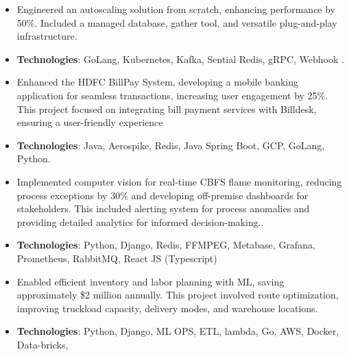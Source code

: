 
  

\begin{itemize}
\item Engineered an autoscaling solution from scratch, enhancing performance by 50\%. Included a managed database, gather tool, and versatile plug-and-play infrastructure.
\item \textbf{Technologies}: GoLang, Kubernetes, Kafka, Sential Redis, gRPC, Webhook .\\
\end{itemize}
\smallskip
\smallskip

\begin{itemize}
\item Enhanced the HDFC BillPay System, developing a mobile banking application for seamless transactions, increasing user engagement by 25\%. This project focused on integrating bill payment services with Billdesk, ensuring a user-friendly experience
\item \textbf{Technologies}: Java, Aerospike, Redis, Java Spring Boot, GCP, GoLang, Python.\\
\end{itemize}
\smallskip
\smallskip

\begin{itemize}
\item Implemented computer vision for real-time CBFS flame monitoring, reducing process exceptions by 30\% and developing off-premise dashboards for stakeholders. This included alerting system for process anomalies and providing detailed analytics for informed decision-making..
\item \textbf{Technologies}: Python, Django, Redis, FFMPEG, Metabase, Grafana, Prometheus, Rabbit\hspace{2mm}MQ, React JS (Typescript)\\
\end{itemize}
\smallskip
\smallskip

\begin{itemize}
\item Enabled efficient inventory and labor planning with ML, saving approximately \$2 million annually. This project involved route optimization, improving truckload capacity, delivery modes, and warehouse locations.
\item \textbf{Technologies}: Python, Django, ML OPS, ETL, lambda, Go, AWS, Docker, Data-bricks,  \\
\end{itemize}
\smallskip
\smallskip

